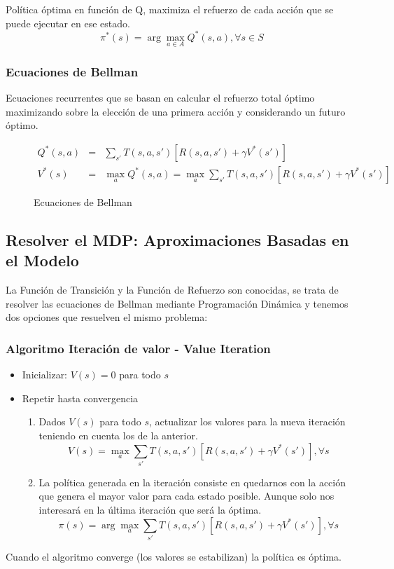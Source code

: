 \documentclass[12pt, twoside, openright]{report} %
\begin{document}
Política óptima en función de Q, maximiza el refuerzo de cada acción que se puede ejecutar en ese estado.
$$\pi^* (s) = \arg \max_{a \in A} Q^* (s,a), \forall s \in S$$
\pagebreak
\subsubsection{Ecuaciones de Bellman}
Ecuaciones recurrentes que se basan en calcular el refuerzo total óptimo maximizando sobre la elección de una primera acción y considerando un futuro óptimo.
\begin{figure}[H]
	\begin{eqnarray*}
		Q^* (s, a) &=& \sum _{s'} T(s, a, s') [R(s, a, s') + \gamma V^* (s')]\\
		V^* (s) &=& \max_a Q^*(s, a) = \max _a \sum _{s'} T(s, a, s') [R(s, a, s') + \gamma V^* (s')]
	\end{eqnarray*}
	\captionsetup{justification=centering}
	\caption{Ecuaciones de Bellman}
\end{figure}

\subsection{Resolver el MDP: Aproximaciones Basadas en el Modelo}
La Función de Transición y la Función de Refuerzo son conocidas, se trata de resolver las ecuaciones de Bellman mediante Programación Dinámica y tenemos dos opciones que resuelven el mismo problema:
\subsubsection{Algoritmo Iteración de valor - Value Iteration}
\begin{itemize}
	\item Inicializar: $V(s) = 0$ para todo $s$
	\item Repetir hasta convergencia
	      \begin{enumerate}
		      \item Dados $V(s)$ para todo $s$, actualizar los valores para la nueva iteración teniendo en cuenta los de la anterior.
		            $$V(s) = \max _a \sum _{s'} T(s,a, s') [R(s,a,s') + \gamma V^* (s')], \forall s$$
		      \item La política generada en la iteración consiste en quedarnos con la acción que genera el mayor valor para cada estado posible. Aunque solo nos interesará en la última iteración que será la óptima.
		            $$\pi(s) = \arg \max_a \sum _{s'} T(s,a, s') [R(s,a,s') + \gamma V^* (s')], \forall s$$
	      \end{enumerate}
\end{itemize}
Cuando el algoritmo converge (los valores se estabilizan) la política es óptima.
\pagebreak
\end{document}
